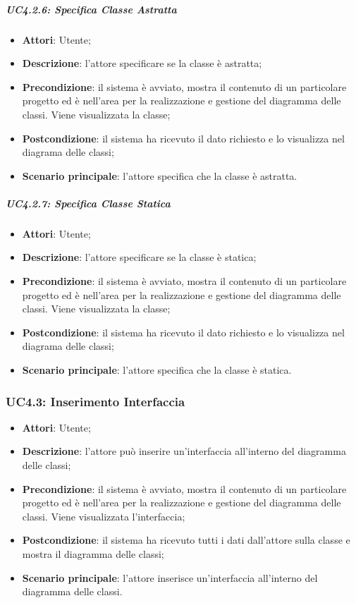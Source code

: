 \subparagraph{UC4.2.6: Specifica Classe Astratta}
\label{UC4.2.6}
\begin{itemize}
	\item \textbf{Attori}: Utente;
	\item \textbf{Descrizione}: l'attore specificare se la classe è astratta;
	\item \textbf{Precondizione}: il sistema è avviato, mostra il contenuto di un particolare progetto ed è nell'area per la realizzazione e gestione del diagramma delle classi. Viene visualizzata la classe;
	\item \textbf{Postcondizione}: il sistema ha ricevuto il dato richiesto e lo visualizza nel diagrama delle classi;
	\item \textbf{Scenario principale}: l'attore specifica che la classe è astratta.
\end{itemize}

\subparagraph{UC4.2.7: Specifica Classe Statica}
\label{UC4.2.7}
\begin{itemize}
	\item \textbf{Attori}: Utente;
	\item \textbf{Descrizione}: l'attore specificare se  la classe è statica;
	\item \textbf{Precondizione}: il sistema è avviato, mostra il contenuto di un particolare progetto ed è nell'area per la realizzazione e gestione del diagramma delle classi. Viene visualizzata la classe;
	\item \textbf{Postcondizione}: il sistema ha ricevuto il dato richiesto e lo visualizza nel diagrama delle classi;
	\item \textbf{Scenario principale}: l'attore specifica che la classe è statica.
\end{itemize}

\subsubsection{UC4.3: Inserimento Interfaccia}
\label{UC4.3}
\begin{itemize}
	\item \textbf{Attori}: Utente;
	\item \textbf{Descrizione}: l'attore può inserire un'interfaccia all'interno del diagramma delle classi;
	\item \textbf{Precondizione}: il sistema è avviato, mostra il contenuto di un particolare progetto ed è nell'area per la realizzazione e gestione del diagramma delle classi. Viene visualizzata l'interfaccia;
	\item \textbf{Postcondizione}: il sistema ha ricevuto tutti i dati dall'attore sulla classe e mostra il diagramma delle classi;
	\item \textbf{Scenario principale}: l'attore inserisce un'interfaccia all'interno del diagramma delle classi.
\end{itemize}

